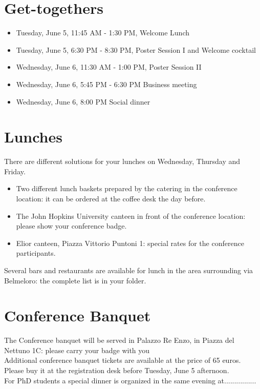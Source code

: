 \section*{Get-togethers}
\begin{itemize}
\item Tuesday, June 5, 11:45 AM - 1:30 PM, Welcome Lunch
\item Tuesday, June 5, 6:30 PM - 8:30 PM, Poster Session I and Welcome cocktail
\item Wednesday, June 6, 11:30 AM - 1:00 PM, Poster Session II
\item Wednesday, June 6, 5:45 PM - 6:30 PM Business meeting
\item Wednesday, June 6, 8:00 PM Social dinner
\end{itemize}
\section*{Lunches}
There are different solutions for your lunches on Wednesday, Thursday and Friday. 
\begin{itemize}
\item Two different lunch baskets prepared by the catering in the conference location: it can be ordered at the coffee desk the day before.
\item The John Hopkins University canteen in front of the conference location: please show your conference badge.
\item Elior canteen, Piazza Vittorio Puntoni 1: special rates for the conference participants.
\end{itemize}
Several bars and restaurants are available for lunch in the area surrounding via Belmeloro: the complete list is in your folder.

\section*{Conference Banquet}
The Conference banquet will be served in Palazzo Re Enzo, in Piazza del Nettuno 1C: please carry your badge with you\\ Additional conference banquet tickets are available at the price of 65 euros. Please buy it at the registration desk before Tuesday, June 5 afternoon.\\ For PhD students a special dinner is organized in the same evening at................
